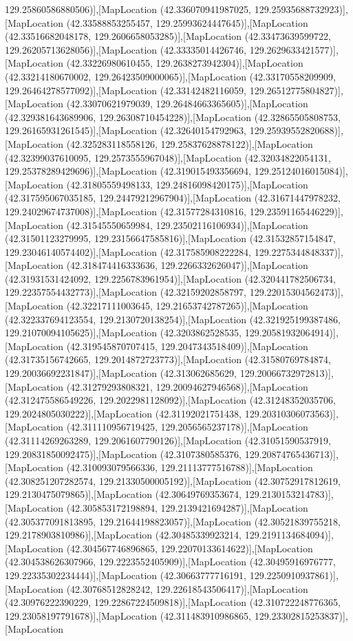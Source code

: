 129.25860586880506)],[MapLocation (42.336070941987025, 129.25935688732923)],[MapLocation (42.33588853255457, 129.25993624447645)],[MapLocation (42.33516682048178, 129.2606658053285)],[MapLocation (42.33473639599722, 129.26205713628056)],[MapLocation (42.33335014426746, 129.2629633421577)],[MapLocation (42.33226980610455, 129.2638273942304)],[MapLocation (42.33214180670002, 129.26423509000065)],[MapLocation (42.33170558209909, 129.26464278577092)],[MapLocation (42.33142482116059, 129.26512775804827)],[MapLocation (42.33070621979039, 129.26484663365605)],[MapLocation (42.329381643689906, 129.26308710454228)],[MapLocation (42.32865505808753, 129.26165931261545)],[MapLocation (42.32640154792963, 129.25939552820688)],[MapLocation (42.325283118558126, 129.25837628878122)],[MapLocation (42.32399037610095, 129.2573555967048)],[MapLocation (42.32034822054131, 129.25378289429696)],[MapLocation (42.319015493356694, 129.25124016015084)],[MapLocation (42.31805559498133, 129.24816098420175)],[MapLocation (42.317595067035185, 129.24479212967904)],[MapLocation (42.31671447978232, 129.24029674737008)],[MapLocation (42.31577284310816, 129.23591165446229)],[MapLocation (42.31545550659984, 129.23502116106934)],[MapLocation (42.31501123279995, 129.23156647585816)],[MapLocation (42.31532857154847, 129.23046140574402)],[MapLocation (42.317585908222284, 129.2275344848337)],[MapLocation (42.318474416333636, 129.2266332626047)],[MapLocation (42.31931531424092, 129.2256783961954)],[MapLocation (42.320441782506734, 129.22357554432773)],[MapLocation (42.32159202858797, 129.22015304562473)],[MapLocation (42.32217111003645, 129.21653742787265)],[MapLocation (42.322337694123554, 129.2130720138254)],[MapLocation (42.321925199387486, 129.21070094105625)],[MapLocation (42.3203862528535, 129.20581932064914)],[MapLocation (42.319545870707415, 129.2047343518409)],[MapLocation (42.31735156742665, 129.2014872723773)],[MapLocation (42.31580769784874, 129.20036692231847)],[MapLocation (42.313062685629, 129.20066732972813)],[MapLocation (42.31279293808321, 129.20094627946568)],[MapLocation (42.312475586549226, 129.2022981128092)],[MapLocation (42.31248352035706, 129.2024805030222)],[MapLocation (42.31192021751438, 129.20310306073563)],[MapLocation (42.311110956719425, 129.2056565237178)],[MapLocation (42.31114269263289, 129.2061607790126)],[MapLocation (42.31051590537919, 129.20831850092475)],[MapLocation (42.3107380585376, 129.20874765436713)],[MapLocation (42.310093079566336, 129.21113777516788)],[MapLocation (42.308251207282574, 129.21330500005192)],[MapLocation (42.30752917812619, 129.2130475079865)],[MapLocation (42.30649769353674, 129.2130153214783)],[MapLocation (42.305853172198894, 129.2139421694287)],[MapLocation (42.305377091813895, 129.21644198823057)],[MapLocation (42.30521839755218, 129.2178903810986)],[MapLocation (42.30485339923214, 129.2191134684094)],[MapLocation (42.304567746896865, 129.22070133614622)],[MapLocation (42.304538626307966, 129.2223552405909)],[MapLocation (42.30495916976777, 129.22335302234444)],[MapLocation (42.30663777716191, 129.2250910937861)],[MapLocation (42.30768512828242, 129.22618543506417)],[MapLocation (42.30976222390229, 129.22867224509818)],[MapLocation (42.310722248776365, 129.23058197791678)],[MapLocation (42.311483910986865, 129.23302815253837)],[MapLocation 
